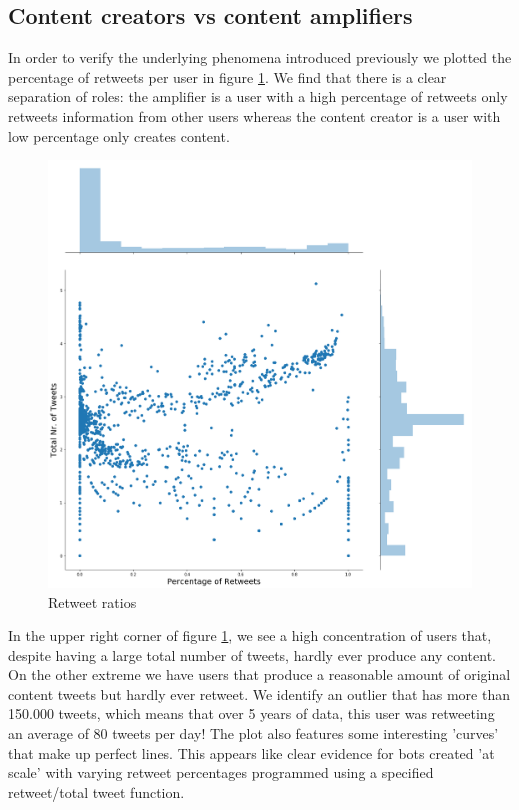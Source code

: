 \documentclass[12pt, authoryear]{elsarticle}
\begin{document}
\subsection{Content creators vs content amplifiers}

In order to verify the underlying phenomena introduced previously we plotted the percentage of retweets per user in figure \ref{retweets:1}. We find that there is a clear separation of roles: the amplifier is a user with a high percentage of retweets only retweets information from other users whereas the content creator is a user with low percentage only creates content.

\begin{figure}[t]
\includegraphics[width=\textwidth]{retweets}
\centering
\caption{Retweet ratios}
\label{retweets:1}
\end{figure}

In the upper right corner of figure \ref{retweets:1}, we see a high concentration of users that, despite having a large total number of tweets, hardly ever produce any content. On the other extreme we have users that produce a reasonable amount of original content tweets but hardly ever retweet. We identify an outlier that has more than 150.000 tweets, which means that over 5 years of data, this user was retweeting an average of 80 tweets per day! The plot also features some interesting 'curves' that make up perfect lines. This appears like clear evidence for bots created 'at scale' with varying retweet percentages programmed using a specified retweet/total tweet function.
\end{document}
